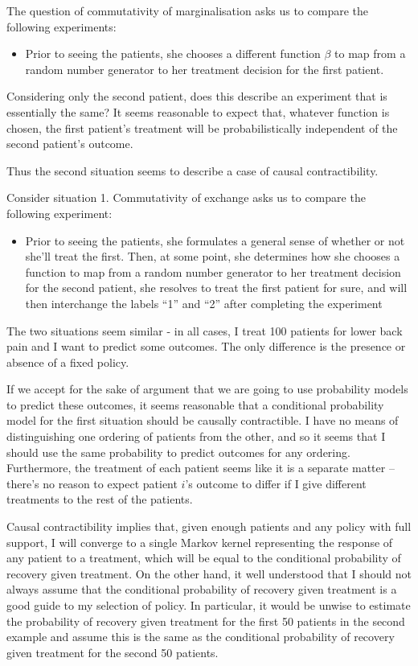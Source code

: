 The question of commutativity of marginalisation asks us to compare the following experiments:

\begin{itemize}
    \item Prior to seeing the patients, she chooses a different function $\beta$ to map from a random number generator to her treatment decision for the first patient.
\end{itemize}

Considering only the second patient, does this describe an experiment that is essentially the same? It seems reasonable to expect that, whatever function is chosen, the first patient's treatment will be probabilistically independent of the second patient's outcome.

Thus the second situation seems to describe a case of causal contractibility.

Consider situation 1. Commutativity of exchange asks us to compare the following experiment:

\begin{itemize}
    \item Prior to seeing the patients, she formulates a general sense of whether or not she'll treat the first. Then, at some point, she determines how she chooses a function to map from a random number generator to her treatment decision for the second patient, she resolves to treat the first patient for sure, and will then interchange the labels ``1'' and ``2'' after completing the experiment
\end{itemize}

The two situations seem similar - in all cases, I treat 100 patients for lower back pain and I want to predict some outcomes. The only difference is the presence or absence of a fixed policy.

If we accept for the sake of argument that we are going to use probability models to predict these outcomes, it seems reasonable that a conditional probability model for the first situation should be causally contractible. I have no means of distinguishing one ordering of patients from the other, and so it seems that I should use the same probability to predict outcomes for any ordering. Furthermore, the treatment of each patient seems like it is a separate matter -- there's no reason to expect patient $i$'s outcome to differ if I give different treatments to the rest of the patients.

Causal contractibility implies that, given enough patients and any policy with full support, I will converge to a single Markov kernel representing the response of any patient to a treatment, which will be equal to the conditional probability of recovery given treatment. On the other hand, it well understood that I should not always assume that the conditional probability of recovery given treatment is a good guide to my selection of policy. In particular, it would be unwise to estimate the probability of recovery given treatment for the first 50 patients in the second example and assume this is the same as the conditional probability of recovery given treatment for the second 50 patients.

